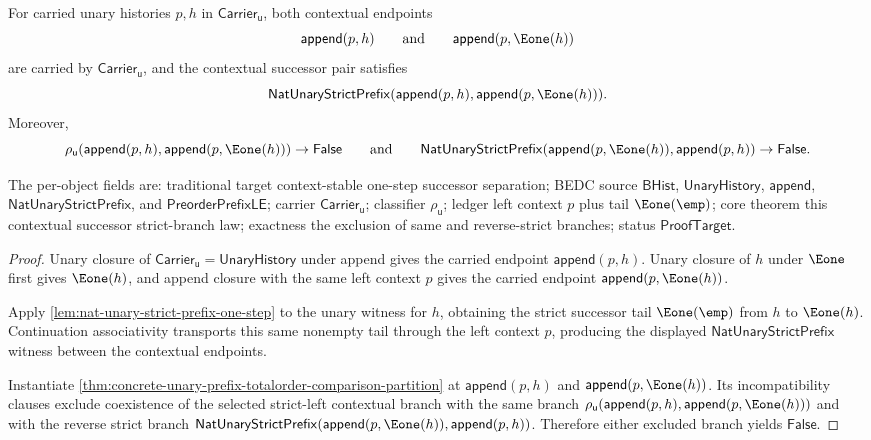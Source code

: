\begin{theorem}
\label{thm:concrete-unary-prefix-totalorder-successor-left-context-strict}
For carried unary histories $p,h$ in $\mathsf{Carrier}_{\mathsf{u}}$, both
contextual endpoints
$$
\mathsf{append}(p,h)
\qquad
\text{and}
\qquad
\mathsf{append}(p,\Eone(h))
$$
are carried by $\mathsf{Carrier}_{\mathsf{u}}$, and the contextual successor
pair satisfies
$$
\mathsf{NatUnaryStrictPrefix}
(\mathsf{append}(p,h),\mathsf{append}(p,\Eone(h))).
$$
Moreover,
$$
\rho_{\mathsf{u}}(\mathsf{append}(p,h),\mathsf{append}(p,\Eone(h)))
\to\mathsf{False}
\qquad
\text{and}
\qquad
\mathsf{NatUnaryStrictPrefix}
(\mathsf{append}(p,\Eone(h)),\mathsf{append}(p,h))
\to\mathsf{False}.
$$

The per-object fields are: traditional target context-stable one-step successor
separation; BEDC source $\mathsf{BHist}$, $\mathsf{UnaryHistory}$,
$\mathsf{append}$, $\mathsf{NatUnaryStrictPrefix}$, and
$\mathsf{PreorderPrefixLE}$; carrier $\mathsf{Carrier}_{\mathsf{u}}$;
classifier $\rho_{\mathsf{u}}$; ledger left context $p$ plus tail
$\Eone(\emp)$; core theorem this contextual successor strict-branch law;
exactness the exclusion of same and reverse-strict branches; status
$\mathsf{ProofTarget}$.
\end{theorem}
\begin{proof}
Unary closure of $\mathsf{Carrier}_{\mathsf{u}}=\mathsf{UnaryHistory}$ under
append gives the carried endpoint $\mathsf{append}(p,h)$. Unary closure of $h$
under $\Eone$ first gives $\Eone(h)$, and append closure with the same left
context $p$ gives the carried endpoint $\mathsf{append}(p,\Eone(h))$.

Apply \autoref{lem:nat-unary-strict-prefix-one-step} to the unary witness for
$h$, obtaining the strict successor tail $\Eone(\emp)$ from $h$ to $\Eone(h)$.
Continuation associativity transports this same nonempty tail through the left
context $p$, producing the displayed
$\mathsf{NatUnaryStrictPrefix}$ witness between the contextual endpoints.

Instantiate
\autoref{thm:concrete-unary-prefix-totalorder-comparison-partition} at
$\mathsf{append}(p,h)$ and $\mathsf{append}(p,\Eone(h))$. Its incompatibility
clauses exclude coexistence of the selected strict-left contextual branch with
the same branch
$\rho_{\mathsf{u}}(\mathsf{append}(p,h),\mathsf{append}(p,\Eone(h)))$ and with
the reverse strict branch
$\mathsf{NatUnaryStrictPrefix}
(\mathsf{append}(p,\Eone(h)),\mathsf{append}(p,h))$. Therefore either excluded
branch yields $\mathsf{False}$.
\end{proof}

